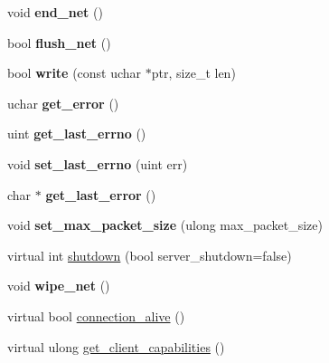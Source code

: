 \begin{DoxyCompactItemize}
\item 
\mbox{\label{classProtocol__classic_a79134dd2d76e2f47ed327cb4850a24df}} 
void {\bfseries end\+\_\+net} ()
\item 
\mbox{\label{classProtocol__classic_ae06550d6b5e770dce819609c960437b0}} 
bool {\bfseries flush\+\_\+net} ()
\item 
\mbox{\label{classProtocol__classic_a1382ba0b507a5a6ddca40b058848061f}} 
bool {\bfseries write} (const uchar $\ast$ptr, size\+\_\+t len)
\item 
\mbox{\label{classProtocol__classic_a5c217400491a04bc0f0ab74d110e8a67}} 
uchar {\bfseries get\+\_\+error} ()
\item 
\mbox{\label{classProtocol__classic_addf6dd5cfed4e37072384f3be2b90121}} 
uint {\bfseries get\+\_\+last\+\_\+errno} ()
\item 
\mbox{\label{classProtocol__classic_a3a74cf1c38197a3eb3c8ebb89d7170bd}} 
void {\bfseries set\+\_\+last\+\_\+errno} (uint err)
\item 
\mbox{\label{classProtocol__classic_a8a7305a81396ec354e3847fb7f6b92fb}} 
char $\ast$ {\bfseries get\+\_\+last\+\_\+error} ()
\item 
\mbox{\label{classProtocol__classic_aff700312472651985f25f701d35f23b0}} 
void {\bfseries set\+\_\+max\+\_\+packet\+\_\+size} (ulong max\+\_\+packet\+\_\+size)
\item 
virtual int \mbox{\hyperlink{classProtocol__classic_aec124efa16faabe9b2afa3ff7510d189}{shutdown}} (bool server\+\_\+shutdown=false)
\item 
\mbox{\label{classProtocol__classic_a5852ac0fed45f402cd094bfcc831e90d}} 
void {\bfseries wipe\+\_\+net} ()
\item 
virtual bool \mbox{\hyperlink{classProtocol__classic_a76a10534621100f5f07105bc26fd6ada}{connection\+\_\+alive}} ()
\item 
virtual ulong \mbox{\hyperlink{classProtocol__classic_aa6779b7a3f3b57f592743b031bbd8eb3}{get\+\_\+client\+\_\+capabilities}} ()

\end{DoxyCompactItemize}
